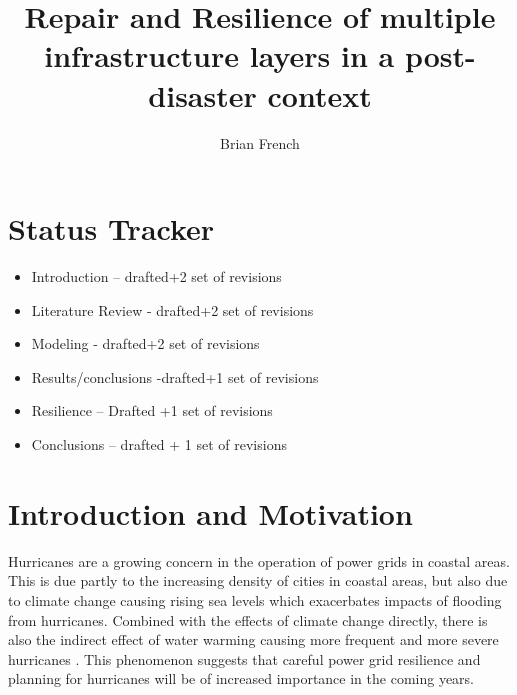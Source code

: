 \documentclass{article}
\begin{document}
	\title{Repair and Resilience of multiple infrastructure layers in a post-disaster context}
	\author{Brian French}
	\maketitle
	\section{Status Tracker}
	\begin{itemize}
		\item Introduction -- drafted+2 set of revisions
		\item Literature Review - drafted+2 set of revisions
		\item Modeling - drafted+2 set of revisions
		\item Results/conclusions -drafted+1 set of revisions
		\item Resilience -- Drafted +1 set of revisions
		\item Conclusions -- drafted + 1 set of revisions
	\end{itemize}
	\doublespacing
	\section{Introduction and Motivation}
	Hurricanes are a growing concern in the operation of power grids in coastal areas. This is due partly to the increasing density of cities in coastal areas, but also due to climate change causing rising sea levels which exacerbates impacts of flooding from hurricanes. Combined with the effects of climate change directly, there is also the indirect effect of water warming causing more frequent and more severe hurricanes \cite{MannEA2006}. This phenomenon suggests that careful power grid resilience and planning for hurricanes will be of increased importance in the coming years.
	
\end{document}
